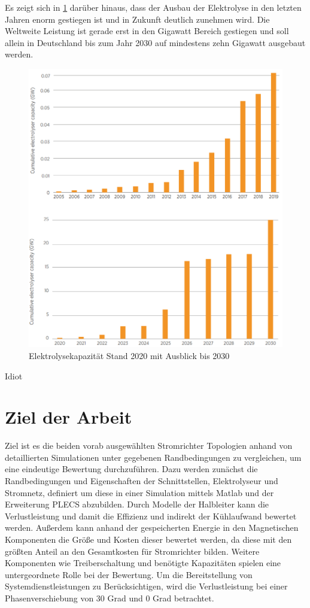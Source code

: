 Es zeigt sich in \ref{fig:elycapacity} darüber hinaus, dass der Ausbau der Elektrolyse in den letzten Jahren enorm gestiegen ist  und in Zukunft deutlich zunehmen wird. Die Weltweite Leistung ist gerade erst in den Gigawatt Bereich gestiegen und soll allein in Deutschland bis zum Jahr 2030 auf mindestens zehn Gigawatt ausgebaut werden.

\begin{figure}
	\centering
	\includegraphics[width=0.7\linewidth]{content/Grafiken/Ely_Capacity}
	\caption[Elektrolyse Kapazität bis 2030]{Elektrolysekapazität Stand 2020 mit Ausblick bis 2030 \cite{IRENA2020}}
	\label{fig:elycapacity}
\end{figure}

Idiot  

\section{Ziel der Arbeit}
Ziel ist es die beiden vorab ausgewählten Stromrichter Topologien anhand von detaillierten Simulationen unter gegebenen Randbedingungen zu vergleichen, um eine eindeutige Bewertung durchzuführen. Dazu werden zunächst die Randbedingungen und Eigenschaften der Schnittstellen, Elektrolyseur und Stromnetz, definiert um diese in einer Simulation mittels Matlab und der Erweiterung PLECS abzubilden. Durch Modelle der Halbleiter kann die Verlustleistung und damit die Effizienz und indirekt der Kühlaufwand bewertet werden. Außerdem kann anhand der gespeicherten Energie in den Magnetischen Komponenten die Größe und Kosten dieser bewertet werden, da diese mit den größten Anteil an den Gesamtkosten für Stromrichter bilden. Weitere Komponenten wie Treiberschaltung und benötigte Kapazitäten spielen eine untergeordnete Rolle bei der Bewertung. Um die Bereitstellung von Systemdienstleistungen zu Berücksichtigen, wird die Verlustleistung bei einer Phasenverschiebung von 30 Grad und 0 Grad betrachtet.